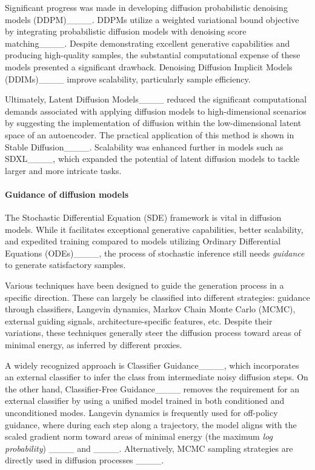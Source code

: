 Significant progress was made in developing diffusion probabilistic denoising models (DDPM)____. DDPMs utilize a weighted variational bound objective by integrating probabilistic diffusion models with denoising score matching____. Despite demonstrating excellent generative capabilities and producing high-quality samples, the substantial computational expense of these models presented a significant drawback. Denoising Diffusion Implicit Models (DDIMs)____ improve scalability, particularly sample efficiency.


Ultimately, Latent Diffusion Models____ reduced the significant computational demands associated with applying diffusion models to high-dimensional scenarios by suggesting the implementation of diffusion within the low-dimensional latent space of an autoencoder. The practical application of this method is shown in Stable Diffusion____. Scalability was enhanced further in models such as SDXL____, which expanded the potential of latent diffusion models to tackle larger and more intricate tasks.

\paragraph{Guidance of diffusion models}
The Stochastic Differential Equation (SDE) framework is vital in diffusion models. While it facilitates exceptional generative capabilities, better scalability, and expedited training compared to models utilizing Ordinary Differential Equations (ODEs)____, the process of stochastic inference still needs \textit{guidance} to generate satisfactory samples.

Various techniques have been designed to guide the generation process in a specific direction. These can largely be classified into different strategies: guidance through classifiers, Langevin dynamics, Markov Chain Monte Carlo (MCMC), external guiding signals, architecture-specific features, etc. Despite their variations, these techniques generally steer the diffusion process toward areas of minimal energy, as inferred by different proxies.



A widely recognized approach is Classifier Guidance____, which incorporates an external classifier to infer the class from intermediate noisy diffusion steps. On the other hand, Classifier-Free Guidance____ removes the requirement for an external classifier by using a unified model trained in both conditioned and unconditioned modes. Langevin dynamics is frequently used for off-policy guidance, where during each step along a trajectory, the model aligns with the scaled gradient norm toward areas of minimal energy (the maximum \textit{log probability}) ____ and ____. Alternatively, MCMC sampling strategies are directly used in diffusion processes ____.


